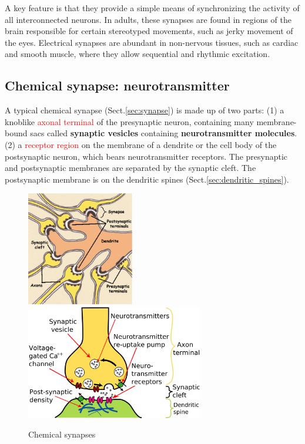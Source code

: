 A key feature is that they provide a simple means of synchronizing the activity
of all interconnected neurons. In adults, these synapses are found in regions of
the brain responsible for certain stereotyped movements, such as jerky movement
of the eyes. Electrical synapses are abundant in non-nervous tissues, such as
cardiac and smooth muscle, where they allow sequential and rhythmic excitation.

\subsection{Chemical synapse: neurotransmitter}
\label{sec:chemical_synapse}


A typical chemical synapse (Sect.\ref{sec:synapse}) is made up of two parts: (1)
a knoblike \textcolor{red}{axonal terminal} of the presynaptic neuron, containing many
membrane-bound sacs called {\bf synaptic vesicles} containing {\bf neurotransmitter molecules}.
(2) a \textcolor{red}{receptor region} on the membrane of a dendrite or the cell
body of the postsynaptic neuron, which bears neurotransmitter receptors.
The presynaptic and postsynaptic membranes are separated by the synaptic cleft.
The postsynaptic membrane is on the dendritic spines
(Sect.\ref{sec:dendritic_spines}).

\begin{figure}[htb]
\centerline{\includegraphics[height=5cm]{./images/synapse.eps}
\includegraphics[height=5cm]{./images/synapse1.eps}}
\caption{Chemical synapses}\label{fig:synapse1}
\end{figure} 

